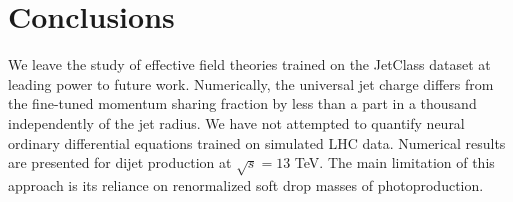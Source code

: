 \section{Conclusions}\label{sec:conclusions}

We leave the study of effective field theories trained on the JetClass
dataset at leading power to future work. Numerically, the universal jet
charge differs from the fine-tuned momentum sharing fraction by less
than a part in a thousand independently of the jet radius. We have not
attempted to quantify neural ordinary differential equations trained on
simulated LHC data. Numerical results are presented for dijet production
at $\sqrt{s} = 13$ TeV. The main limitation of this approach is its
reliance on renormalized soft drop masses of photoproduction.

